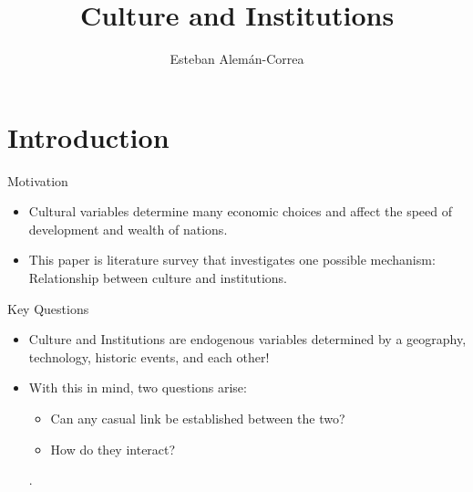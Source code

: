 \documentclass{beamer}
\title[Alesina  \& Giulano (2015)]{Culture and Institutions}
\subtitle{}
\author[EAC]{Esteban Alemán-Correa}
\institute[SMU]
{
   Southern Methodist University
}
\date[31/01/24]{}
\begin{document}
   \begin{frame}
        \maketitle
    \end{frame}

   
    \section{Introduction}
    \begin{frame}{Motivation}
        \begin{itemize}
        \item Cultural variables determine many economic choices and affect the speed of development and wealth of nations.
                   \vspace{0.5cm} 
                   \pause 
        \item  This paper is literature survey that investigates one possible mechanism: Relationship between culture and institutions.
        \end{itemize}
    \end{frame}
    \begin{frame}{Key Questions}
                \begin{itemize}
              \item Culture and Institutions are endogenous variables determined by a geography, technology, historic events, and each other!
            
                   \vspace{0.10cm} 
                   \pause 
            \item With this in mind, two questions arise:
            \begin{itemize}
                \item Can any casual link be established between the two?
                \item How do they interact?
            \end{itemize}.
            
        \end{itemize}
    \end{frame}
     
\end{document}
